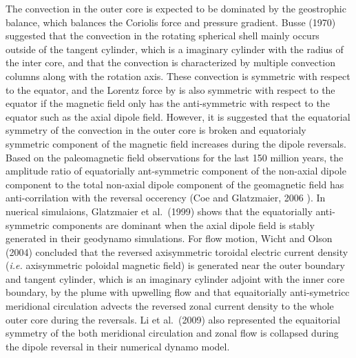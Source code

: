 The convection in the outer core is expected to be dominated by the geostrophic balance, which balances the Coriolis force and pressure gradient. 
Busse (1970) \cite{Busse:1970} suggested that the convection in the rotating spherical shell mainly occurs outside of the tangent cylinder, which is a imaginary cylinder with the radius of the inter core, and that the convection is characterized by multiple convection columns along with the rotation axis. 
These convection is symmetric with respect to the equator, and the Lorentz force by is also symmetric with respect to the equator if the magnetic field only has the anti-symmetric with respect to the equator such as the axial dipole field.
However, it is suggested that the equatorial symmetry of the convection in the outer core is broken and equatorialy symmetric component of the magnetic field increases during the dipole reversals. Based on the paleomagnetic field observations for the last 150 million years, the amplitude ratio of equatorially ant-symmetric component of the non-axial dipole component to the total non-axial dipole component of the geomagnetic field has anti-corrilation with the reversal occerency (Coe and Glatzmaier, 2006 \cite{Coe:2006}). In nuerical simulaions, Glatzmaier et al.\ (1999) \cite{Glatzmaier:1999} shows that the equatorially anti-symmetric components are dominant when the axial dipole field is stably generated in their geodynamo simulations. For flow motion, Wicht and Olson (2004) concluded that the reversed axisymmetric toroidal electric current density ({\it i.e.} axisymmetric poloidal magnetic field) is generated near the outer boundary and tangent cylinder, which is an imaginary cylinder adjoint with the inner core boundary, by the plume with upwelling flow and that equaitorially anti-symetricc meridional circulation advects the reversed zonal current density to the whole outer core during the reversals. Li et al.\ (2009) \cite{Li:2002} also represented the equaitorial symmetry of the both meridional circulation and zonal flow is collapsed during the dipole reversal in their numerical dynamo model.

